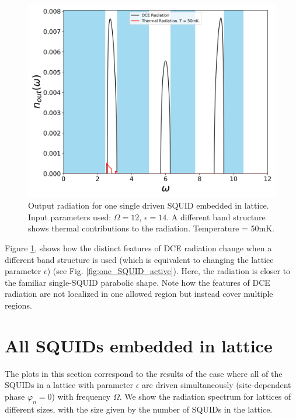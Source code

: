 \begin{figure}[h]
    \includegraphics[width=\textwidth, keepaspectratio]{figures/results/one_SQUID_active_epsilon_14.png}
    \caption{Output radiation for one single driven SQUID embedded in lattice. Input parameters used: $\Omega=12$, $\epsilon=14$. A different band structure shows thermal contributions to the radiation. Temperature = 50mK.}
    \label{fig:one_SQUID_active_e_14_T_50}
\end{figure}
%

\newpage

Figure \ref{fig:one_SQUID_active_e_14_T_50}, shows how the distinct features of DCE radiation change when a different band structure is used (which is equivalent to changing the lattice parameter $\epsilon$) (see Fig. \ref{fig:one_SQUID_active}). Here, the radiation is closer to the familiar single-SQUID parabolic shape. Note how the features of DCE radiation are not localized in one allowed region but instead cover multiple regions. 

\section{All SQUIDs embedded in lattice}\label{sec:results_all_active}

The plots in this section correspond to the results of the case where all of the SQUIDs in a lattice with parameter $\epsilon$ are driven simultaneously (site-dependent phase $\varphi_n=0$) with frequency $\Omega$. We show the radiation spectrum for lattices of different sizes, with the size given by the number of SQUIDs in the lattice.

